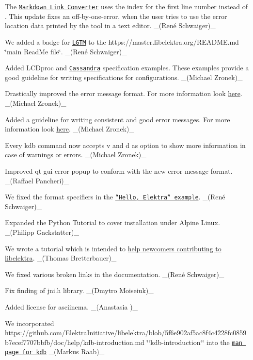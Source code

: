 \begin{DoxyItemize}
\item The \href{https://master.libelektra.org/doc/markdownlinkconverter}{\tt Markdown Link Converter} uses the index {} for the first line number instead of {}. This update fixes an off-\/by-\/one-\/error, when the user tries to use the error location data printed by the tool in a text editor. \+\_\+(René Schwaiger)\+\_\+
\item We added a badge for \href{https://lgtm.com}{\tt L\+G\+TM} to the https\+://master.libelektra.\+org/\+R\+E\+A\+D\+ME.md \char`\"{}main Read\+Me file\char`\"{}. \+\_\+(René Schwaiger)\+\_\+
\item Added L\+C\+Dproc and \href{/home/jenkins/workspace/libelektra-release/examples/spec/cassandra.ini}{\tt Cassandra} specification examples. These examples provide a good guideline for writing specifications for configurations. \+\_\+(\+Michael Zronek)\+\_\+
\item Drastically improved the error message format. For more information look \hyperlink{doc_decisions_error_message_format_md}{here}. \+\_\+(\+Michael Zronek)\+\_\+
\item Added a guideline for writing consistent and good error messages. For more information look \hyperlink{doc_dev_error-message_md}{here}. \+\_\+(\+Michael Zronek)\+\_\+
\item Every {\ttfamily kdb} command now accepts {\ttfamily v} and {\ttfamily d} as option to show more information in case of warnings or errors. \+\_\+(\+Michael Zronek)\+\_\+
\item Improved qt-\/gui error popup to conform with the new error message format. \+\_\+(\+Raffael Pancheri)\+\_\+
\item We fixed the format specifiers in the \href{https://master.libelektra.org/examples/helloElektra.c}{\tt “\+Hello, Elektra” example}. \+\_\+(René Schwaiger)\+\_\+
\item Expanded the Python Tutorial to cover installation under Alpine Linux. \+\_\+(\+Philipp Gackstatter)\+\_\+
\item We wrote a tutorial which is intended to \hyperlink{doc_tutorials_contributing-clion_md}{help newcomers contributing to libelektra}. \+\_\+(\+Thomas Bretterbauer)\+\_\+
\item We fixed various broken links in the documentation. \+\_\+(René Schwaiger)\+\_\+
\item Fix finding of jni.\+h library. \+\_\+(\+Dmytro Moiseiuk)\+\_\+
\item Added license for asciinema. \+\_\+(Anastasia )\+\_\+
\item We incorporated https\+://github.com/\+Elektra\+Initiative/libelektra/blob/5f6e902af5ac8f4c4228fc0859b7ecef7707bbfb/doc/help/kdb-\/introduction.\+md \char`\"{}`kdb-\/introduction`\char`\"{} into the \href{https://www.libelektra.org/manpages/kdb}{\tt man page for {\ttfamily kdb}} \+\_\+(\+Markus Raab)\+\_\+
\end{DoxyItemize}


